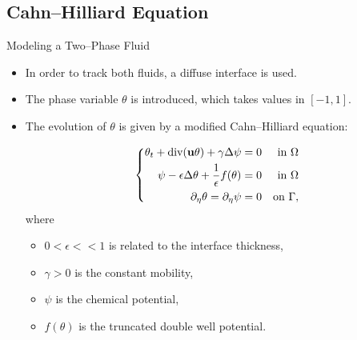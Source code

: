 \documentclass[9pt]{beamer}
\newcommand{\diverg}{\textup{div} }
\newcommand{\eps}{\epsilon}
\newcommand{\lap}{\Delta}
\begin{document}
\subsection{Cahn--Hilliard Equation}
\begin{frame}{Modeling a Two--Phase Fluid}
\begin{itemize}
	\item In order to track both fluids, a diffuse interface is used.
	\item The phase variable $\theta$ is introduced, which takes values in $[-1,1]$.
	\item The evolution of $\theta$ is given by a modified Cahn--Hilliard equation:
	\vspace{.1in}\\
	\begin{minipage}{.5\paperwidth}
		$$
		\left\{
		\begin{aligned}
		\theta_t + \diverg(\mathbf{u}\theta) + \gamma \lap \psi &= 0 &\text{in }\Omega \\
		\psi - \eps \lap \theta + \frac{1}{\eps}f(\theta) &= 0 & \text{in }\Omega \\
		\partial_\eta \theta = \partial_\eta\psi &= 0 & \text{on }\Gamma,
		\end{aligned}
		\right.
		$$
		where
		\begin{itemize}
			\item $0 < \eps << 1$ is related to the interface thickness,
			\item $\gamma >0$ is the constant mobility,
			\item $\psi$ is the chemical potential,
			\item $f(\theta)$ is the truncated double well potential.
		\end{itemize}
	\end{minipage}%
	\begin{minipage}{.3\paperwidth}
		\begin{figure}[!b]
			\centering
			

\end{figure}
\end{minipage}
\end{itemize}
\end{frame}
\end{document}
